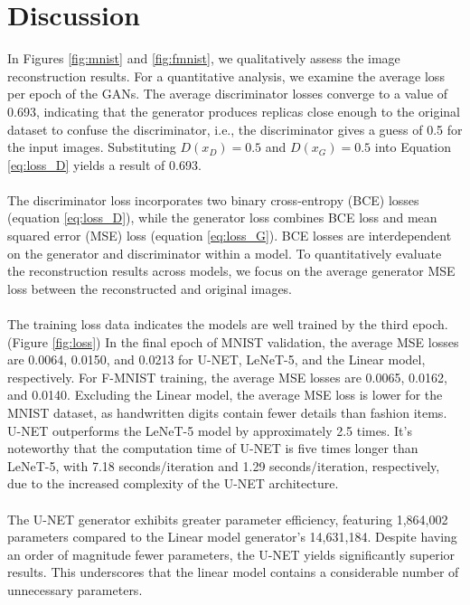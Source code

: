 \section{Discussion}
In Figures \ref{fig:mnist} and \ref{fig:fmnist}, we qualitatively assess the image reconstruction results. For a quantitative analysis, we examine the average loss per epoch of the GANs. The average discriminator losses converge to a value of 0.693, indicating that the generator produces replicas close enough to the original dataset to confuse the discriminator, i.e., the discriminator gives a guess of 0.5 for the input images. Substituting $D(x_{D}) = 0.5$ and $D(x_{G}) = 0.5$ into Equation \ref{eq:loss_D} yields a result of 0.693.
\\\\
The discriminator loss incorporates two binary cross-entropy (BCE) losses (equation \ref{eq:loss_D}), while the generator loss combines BCE loss and mean squared error (MSE) loss (equation \ref{eq:loss_G}). BCE losses are interdependent on the generator and discriminator within a model. To quantitatively evaluate the reconstruction results across models, we focus on the average generator MSE loss between the reconstructed and original images. 
\\\\
\noindent The training loss data indicates the models are well trained by the third epoch. (Figure \ref{fig:loss}) In the final epoch of MNIST validation, the average MSE losses are 0.0064, 0.0150, and 0.0213 for U-NET, LeNeT-5, and the Linear model, respectively. For F-MNIST training, the average MSE losses are 0.0065, 0.0162, and 0.0140. Excluding the Linear model, the average MSE loss is lower for the MNIST dataset, as handwritten digits contain fewer details than fashion items. U-NET outperforms the LeNeT-5 model by approximately 2.5 times. It's noteworthy that the computation time of U-NET is five times longer than LeNeT-5, with 7.18 seconds/iteration and 1.29 seconds/iteration, respectively, due to the increased complexity of the U-NET architecture. 
\\\\
\noindent The U-NET generator exhibits greater parameter efficiency, featuring 1,864,002 parameters compared to the Linear model generator's 14,631,184. Despite having an order of magnitude fewer parameters, the U-NET yields significantly superior results. This underscores that the linear model contains a considerable number of unnecessary parameters.
\\\\
